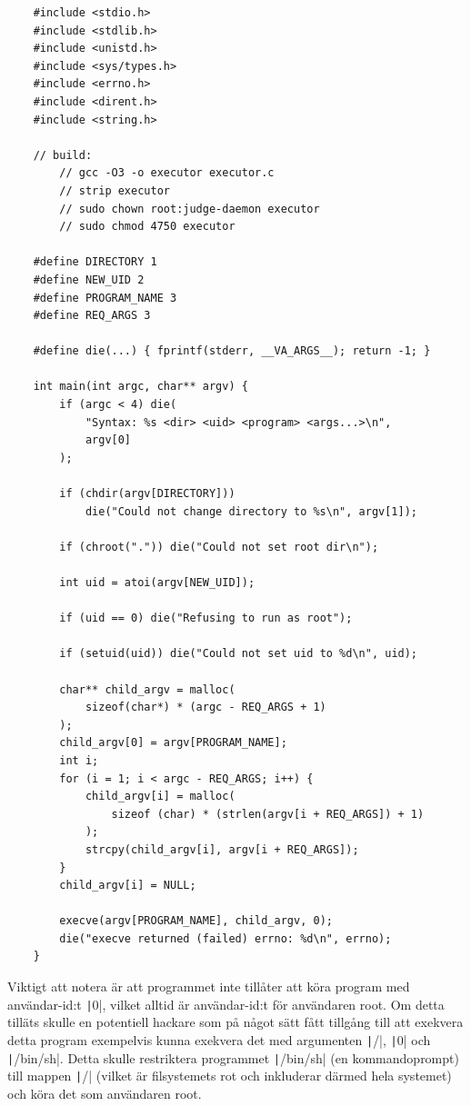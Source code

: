 \documentclass{article}
\begin{document}
\begin{verbatim}
	#include <stdio.h>
	#include <stdlib.h>
	#include <unistd.h>
	#include <sys/types.h>
	#include <errno.h>
	#include <dirent.h>
	#include <string.h>

	// build:
		// gcc -O3 -o executor executor.c
		// strip executor
		// sudo chown root:judge-daemon executor
		// sudo chmod 4750 executor

	#define DIRECTORY 1
	#define NEW_UID 2
	#define PROGRAM_NAME 3
	#define REQ_ARGS 3

	#define die(...) { fprintf(stderr, __VA_ARGS__); return -1; }

	int main(int argc, char** argv) {
		if (argc < 4) die(
			"Syntax: %s <dir> <uid> <program> <args...>\n",
			argv[0]
		);

		if (chdir(argv[DIRECTORY]))
			die("Could not change directory to %s\n", argv[1]);

		if (chroot(".")) die("Could not set root dir\n");

		int uid = atoi(argv[NEW_UID]);

		if (uid == 0) die("Refusing to run as root");

		if (setuid(uid)) die("Could not set uid to %d\n", uid);

		char** child_argv = malloc(
			sizeof(char*) * (argc - REQ_ARGS + 1)
		);
		child_argv[0] = argv[PROGRAM_NAME];
		int i;
		for (i = 1; i < argc - REQ_ARGS; i++) {
			child_argv[i] = malloc(
				sizeof (char) * (strlen(argv[i + REQ_ARGS]) + 1)
			);
			strcpy(child_argv[i], argv[i + REQ_ARGS]);
		}
		child_argv[i] = NULL;

		execve(argv[PROGRAM_NAME], child_argv, 0);
		die("execve returned (failed) errno: %d\n", errno);
	}
\end{verbatim}

Viktigt att notera är att programmet inte tillåter att köra program med
användar-id:t \texttt|0|, vilket alltid är användar-id:t för användaren root. Om
detta tilläts skulle en potentiell hackare som på något sätt fått tillgång till
att exekvera detta program exempelvis kunna exekvera det med argumenten
\texttt|/|,
\texttt|0| och
\texttt|/bin/sh|.
Detta skulle restriktera programmet
\texttt|/bin/sh|
(en kommandoprompt) till mappen \texttt|/| (vilket är filsystemets rot och
inkluderar därmed hela systemet) och köra det som användaren root.
\end{document}
